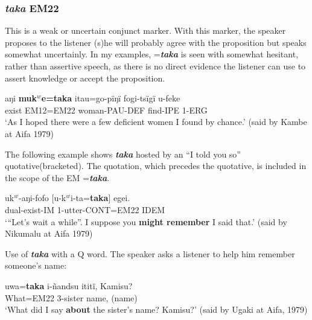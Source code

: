 \documentclass[output=paper]{langsci/langscibook}
\begin{document}
\subsubsection{\textit{taka} EM22} 
This is a weak or uncertain conjunct marker. With this marker,  the speaker proposes to the listener (s)he will probably agree with the proposition but speaks somewhat uncertainly.  In my examples, =\textbf{\textit{taka}} is seen with somewhat hesitant, rather than assertive speech, as there is no direct evidence the listener can use to assert knowledge or accept the proposition.

\begin{exe}
	\ex \label{ex:eb52}
	\gll aŋi \textbf{muk$^w$e=taka} itau=go-pïŋï fogi-tsïgï u-feke\\
	exist EM12=EM22 woman-PAU-DEF find-IPE 1-ERG\\
	\trans ‘As I hoped there were a few deficient women I found by chance.’ (said by Kambe at Aifa 1979)
\end{exe}

The following example shows \textbf{\textit{taka}} hosted by an “I told you so” quotative(bracketed). The quotation, which precedes the quotative, is included in the scope of the EM =\textbf{\textit{taka}}.

\begin{exe}
	\ex \label{ex:eb53}
	\gll uk$^w$-aŋi-fofo [u-k$^w$i-ta=\textbf{taka}] egei.\\
	dual-exist-IM 1-utter-CONT=EM22 IDEM\\
	\trans ‘“Let's wait a while”.  I suppose you \textbf{might remember} I said that.’ (said by Nikumalu at Aifa 1979)
\end{exe}

Use of \textbf{\textit{taka}} with a Q word. The speaker asks a listener to help him remember someone’s name:

\begin{exe}
	\ex \label{ex:eb54}
	\gll uwa=\textbf{taka} i-ñandsu ititï, Kamisu?\\
	What=EM22 3-sister name, (name)\\
	\trans ‘What did I say \textbf{about} the sister’s name?  Kamisu?’ (said by Ugaki at Aifa, 1979)
\end{exe}
\end{document}
